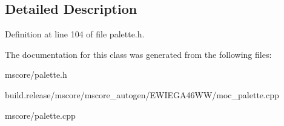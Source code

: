 \subsection{Detailed Description}


Definition at line 104 of file palette.\+h.



The documentation for this class was generated from the following files\+:\begin{DoxyCompactItemize}
\item 
mscore/palette.\+h\item 
build.\+release/mscore/mscore\+\_\+autogen/\+E\+W\+I\+E\+G\+A46\+W\+W/moc\+\_\+palette.\+cpp\item 
mscore/palette.\+cpp\end{DoxyCompactItemize}
